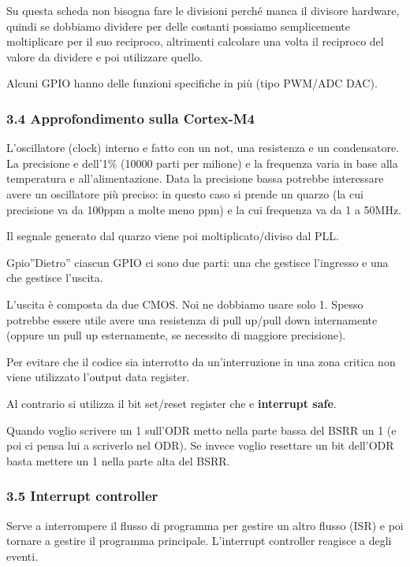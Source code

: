 \documentclass[
]{article}
\begin{document}
Su questa scheda non bisogna fare le divisioni perché manca il divisore
hardware, quindi se dobbiamo dividere per delle costanti possiamo
semplicemente moltiplicare per il suo reciproco, altrimenti calcolare
una volta il reciproco del valore da dividere e poi utilizzare quello.

Alcuni GPIO hanno delle funzioni specifiche in più (tipo PWM/ADC DAC).

\subsubsection{3.4 Approfondimento sulla
Cortex-M4}\label{approfondimento-sulla-cortex-m4}

L'oscillatore (clock) interno e fatto con un not, una resistenza e un
condensatore. La precisione e dell'1\% (10000 parti per milione) e la
frequenza varia in base alla temperatura e all'alimentazione. Data la
precisione bassa potrebbe interessare avere un oscillatore più preciso:
in questo caso si prende un quarzo (la cui precisione va da 100ppm a
molte meno ppm) e la cui frequenza va da 1 a 50MHz.

Il segnale generato dal quarzo viene poi moltiplicato/diviso dal PLL.

Gpio''Dietro'' ciascun GPIO ci sono due parti: una che gestisce
l'ingresso e una che gestisce l'uscita.

L'uscita è composta da due CMOS. Noi ne dobbiamo usare solo 1. Spesso
potrebbe essere utile avere una resistenza di pull up/pull down
internamente (oppure un pull up esternamente, se necessito di maggiore
precisione).

Per evitare che il codice sia interrotto da un'interruzione in una zona
critica non viene utilizzato l'output data register.

Al contrario si utilizza il bit set/reset register che e
\textbf{interrupt safe}.

Quando voglio scrivere un 1 sull'ODR metto nella parte bassa del BSRR un
1 (e poi ci pensa lui a scriverlo nel ODR). Se invece voglio resettare
un bit dell'ODR basta mettere un 1 nella parte alta del BSRR.

\subsubsection{3.5 Interrupt controller}\label{interrupt-controller}

Serve a interrompere il flusso di programma per gestire un altro flusso
(ISR) e poi tornare a gestire il programma principale. L'interrupt
controller reagisce a degli eventi.
\end{document}
